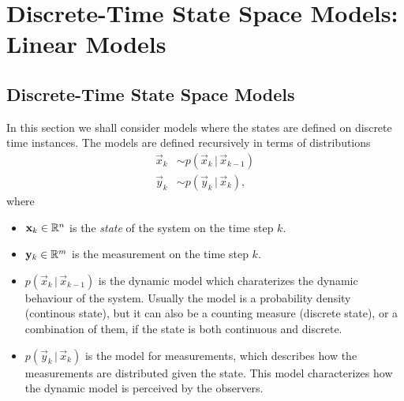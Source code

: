 %
\chapter{Discrete-Time State Space Models: \\ Linear Models}
\label{ch:Linear-models}
%

\section{Discrete-Time State Space Models}

In this section we shall consider models where the states are defined
on discrete time instances. The models are defined recursively in
terms of distributions
%
\begin{equation}
\begin{split}
    \vec{x}_k &\sim p(\vec{x}_k\,|\,\vec{x}_{k-1}) \\
    \vec{y}_k &\sim p(\vec{y}_k\,|\,\vec{x}_k),
\end{split}
\label{eq:dss_model}
\end{equation}
%
where
%
\begin{itemize}
\item $\mathbf{x}_k \in \mathbb{R}^n$ is the {\em state} of the system on
  the time step $k$.
  
\item $\mathbf{y}_k \in \mathbb{R}^m$ is the measurement on the time step $k$.

\item $p(\vec{x}_k\,|\,\vec{x}_{k-1})$ is the dynamic model which
charaterizes the dynamic behaviour of the system. Usually the model is
a probability density (continous state), but it can also be a counting
measure (discrete state), or a combination of them, if the state is
both continuous and discrete.
%
\item $p(\vec{y}_k\,|\,\vec{x}_k)$ is the model for measurements,
which describes how the measurements are distributed given the
state. This model characterizes how the dynamic model is perceived by
the observers.
\end{itemize}


